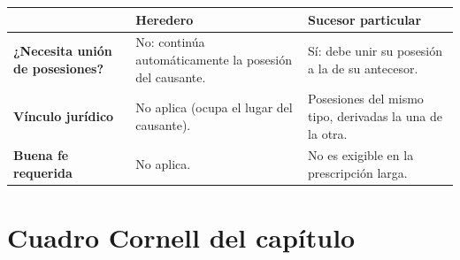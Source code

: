\documentclass[12pt,oneside]{book}
\begin{document}

\begin{center}
\begin{tabularx}{\textwidth}{@{}>{\raggedright\arraybackslash}p{} >{\raggedright\arraybackslash}X >{\raggedright\arraybackslash}X@{}}
\toprule
 & \textbf{Heredero} & \textbf{Sucesor particular} \\
\midrule
\textbf{¿Necesita unión de posesiones?} & No: continúa automáticamente la posesión del causante. & Sí: debe unir su posesión a la de su antecesor. \\
\textbf{Vínculo jurídico} & No aplica (ocupa el lugar del causante). & Posesiones del mismo tipo, derivadas la una de la otra. \\
\textbf{Buena fe requerida} & No aplica. & No es exigible en la prescripción larga. \\
\bottomrule
\end{tabularx}
\end{center}

\section{Cuadro Cornell del capítulo}
\end{document}

